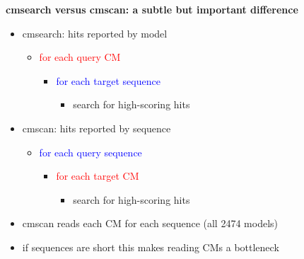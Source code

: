 \documentclass[landscape]{slides}
\begin{document}
\begin{slide}
\begin{center}
\textbf{cmsearch versus cmscan: a subtle but important difference}
\end{center}

\scriptsize
\begin{itemize}
\item cmsearch: hits reported by model
  \begin{itemize}
  \item \textcolor{red}{for each query} \textcolor{red}{CM}
    \begin{itemize}
    \item \textcolor{blue}{for each target} \textcolor{blue}{sequence}
      \begin{itemize}
      \item search for high-scoring hits
      \end{itemize}
    \end{itemize}
  \end{itemize}
\end{itemize}

\begin{itemize}
\item cmscan: hits reported by sequence
  \begin{itemize}
  \item \textcolor{blue}{for each query} \textcolor{blue}{sequence}
    \begin{itemize}
    \item \textcolor{red}{for each target} \textcolor{red}{CM}
      \begin{itemize}
      \item search for high-scoring hits
      \end{itemize}
    \end{itemize}
  \end{itemize}
\end{itemize}

\begin{itemize}
\item cmscan reads each CM for each sequence (all 2474 models)
\item if sequences are short this makes reading CMs a bottleneck
\end{itemize}

\vfill
\end{slide}
\end{document}
